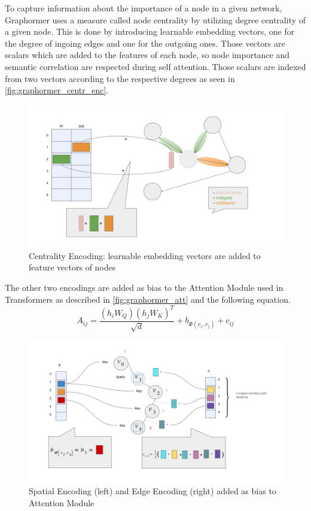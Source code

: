 To capture information about the importance of a node in a given network, Graphormer uses a measure called node centrality by utilizing degree centrality of a given node. This is done by introducing learnable embedding vectors, one for the degree of ingoing edges and one for the outgoing ones. Those vectors are scalars which are added to the features of each node, so node importance and semantic correlation are respected during self attention. Those scalars are indexed from two vectors according to the respective degrees as seen in \autoref{fig:graphormer_centr_enc}.

\begin{figure}[ht!]
    \centering
    \includegraphics[scale=0.35]{tex/res/graphormer_centr_enc.png}
    \caption{Centrality Encoding: learnable embedding vectors are added to feature vectors of nodes}
    \label{fig:graphormer_centr_enc}
\end{figure}

The other two encodings are added as bias to the Attention Module used in Transformers as described in \autoref{fig:graphormer_att} and the following equation.
\begin{equation}
    A_{ij} = \frac{(h_i W_Q)(h_j W_K)^T}{\sqrt{d}} + b_{\Phi (v_i, v_j)} + c_{ij}
    \label{eqn:attention-matrix}
\end{equation}

\begin{figure}[ht!]
    \centering
    \includegraphics[scale=0.35]{tex/res/graphormer_attention.png}
    \caption{Spatial Encoding (left) and Edge Encoding (right) added as bias to Attention Module}
    \label{fig:graphormer_att}
\end{figure}

